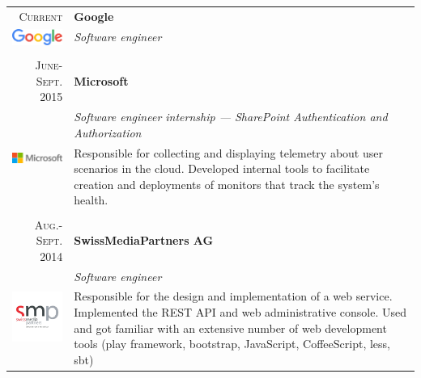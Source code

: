 \documentclass[a4paper,11pt]{article} %
\begin{document}
\begin{tabularx}{\textwidth}{r|X}

\textsc{Current} & \textbf{Google} \\
\multirow{2}{*}{ \includegraphics[width=60pt]{img/google.eps}}
& \emph{Software engineer}\\ 
& \footnotesize{}\\
\multicolumn{2}{c}{} \\


\textsc{June-Sept. 2015} & \textbf{Microsoft} \\
\multirow{2}{*}{ \includegraphics[width=60pt]{img/microsoft.eps}}
& \emph{Software engineer internship --- SharePoint Authentication and Authorization}\\ 
& \footnotesize{Responsible for collecting and displaying telemetry about user
scenarios in the cloud. Developed internal tools to facilitate creation and deployments
of monitors that track the system's health.}\\
\multicolumn{2}{c}{} \\


\textsc{Aug.-Sept. 2014} & \textbf{SwissMediaPartners AG} \\
\multirow{4}{*}{ \includegraphics[width=60pt]{img/smp.jpg}}
& \emph{Software engineer}\\ 
& \footnotesize{Responsible for the design and implementation of a web
service. Implemented the REST API and web administrative console. Used
and got familiar with an extensive number of web development tools (play
framework, bootstrap, JavaScript, CoffeeScript, less, sbt)}\\ 


\end{tabularx}
\end{document}
